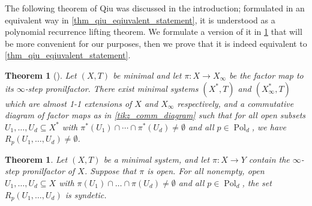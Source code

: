 \documentclass{article}
\theoremstyle{plain}
\newtheorem{theorem}[Theorem]{Theorem}
\theoremstyle{claim}
\theoremstyle{definition}
\theoremstyle{plain}
\theoremstyle{plain}
\newcommand{\Pol}{\operatorname{Pol}}
\newcommand{\1}{\boldsymbol{1}}
\begin{document}
The following theorem of Qiu was discussed in the introduction; formulated in an equivalent way in \cref{thm_qiu_eqiuvalent_statement}, it is understood as a polynomial recurrence lifting theorem.  We formulate a version of it in \cref{thm_QiuC} that will be more convenient for our purposes, then we prove that it is indeed equivalent to \cref{thm_qiu_eqiuvalent_statement}.

\begin{theorem}[{\cite[Theorem B]{Qiu23}}]
\label{thm_QiuB}
Let $(X, T)$ be minimal and let $\pi: X \to X_{\infty}$ be the factor map to its $\infty$-step pronilfactor. There exist minimal systems $(X^*,T)$ and $(X_{\infty}^*,T)$ which are almost 1-1 extensions of $X$ and $X_{\infty}$ respectively, and a commutative diagram of factor maps as in \eqref{tikz_comm_diagram} such that for all open subsets $U_1, \ldots, U_d \subseteq X^*$ with $\pi^*(U_1)\cap\cdots\cap \pi^*(U_d)\neq \emptyset$ and all $p\in \Pol_d$,  we have $R_p(U_1,\ldots,U_d)\neq \emptyset$.
\end{theorem}


\begin{theorem}
\label{thm_QiuC}
Let $(X, T)$ be a minimal system, and let $\pi: X \to Y$ contain the $\infty$-step pronilfactor of $X$.  Suppose that $\pi$ is open.  For all nonempty, open $U_1, \ldots, U_d \subseteq X$ with $\pi(U_1)\cap\ldots\cap \pi(U_d)\neq \emptyset$ and all $p \in \Pol_d$, the set $R_p(U_1,\ldots,U_d)$ is syndetic.
\end{theorem}
\end{document}
